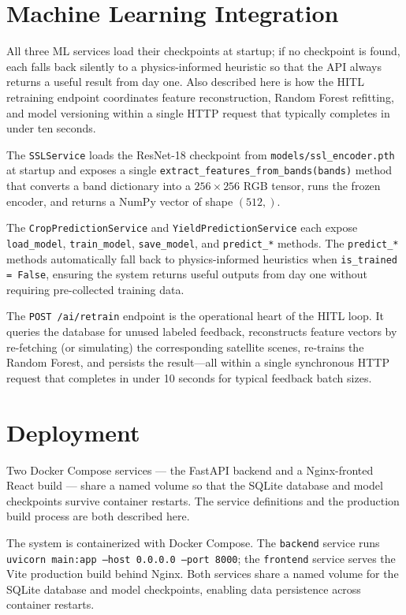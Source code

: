 \documentclass[12pt,a4paper,oneside]{report}
\begin{document}
\section{Machine Learning Integration}

All three ML services load their checkpoints at startup; if no checkpoint is found, each falls back silently to a physics-informed heuristic so that the API always returns a useful result from day one. Also described here is how the HITL retraining endpoint coordinates feature reconstruction, Random Forest refitting, and model versioning within a single HTTP request that typically completes in under ten seconds.

The \texttt{SSLService} loads the ResNet-18 checkpoint from
\texttt{models/ssl\_encoder.pth} at startup and exposes a single
\texttt{extract\_features\_from\_bands(bands)} method that converts a band dictionary
into a $256\times256$ RGB tensor, runs the frozen encoder, and returns a NumPy vector
of shape $(512,)$.

The \texttt{CropPredictionService} and \texttt{YieldPredictionService} each expose
\texttt{load\_model}, \texttt{train\_model}, \texttt{save\_model}, and
\texttt{predict\_*} methods. The \texttt{predict\_*} methods automatically fall back
to physics-informed heuristics when \texttt{is\_trained = False}, ensuring the
system returns useful outputs from day one without requiring pre-collected training data.

The \texttt{POST /ai/retrain} endpoint is the operational heart of the HITL loop.
It queries the database for unused labeled feedback, reconstructs feature vectors by
re-fetching (or simulating) the corresponding satellite scenes, re-trains the Random
Forest, and persists the result—all within a single synchronous HTTP request that
completes in under 10 seconds for typical feedback batch sizes.

\section{Deployment}

Two Docker Compose services — the FastAPI backend and a Nginx-fronted React build — share a named volume so that the SQLite database and model checkpoints survive container restarts. The service definitions and the production build process are both described here.

The system is containerized with Docker Compose. The \texttt{backend} service
runs \texttt{uvicorn main:app --host 0.0.0.0 --port 8000}; the \texttt{frontend}
service serves the Vite production build behind Nginx. Both services share a named
volume for the SQLite database and model checkpoints, enabling data persistence
across container restarts.
\end{document}
